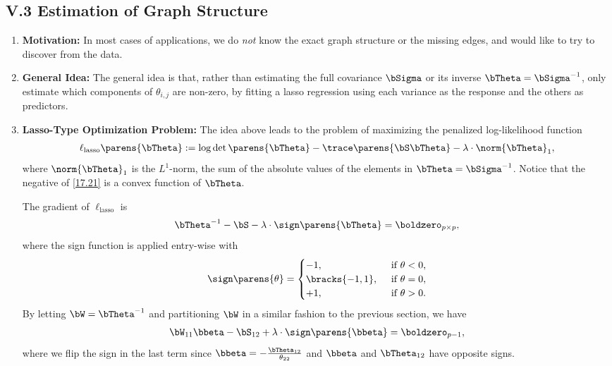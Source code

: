 \documentclass[12pt]{article}
\begin{document}
\subsection*{V.3 Estimation of Graph Structure}

\begin{enumerate}[label=\textbf{\arabic*.}]

	\item \textbf{Motivation:} In most cases of applications, we do \emph{not} know the exact graph structure or the missing edges, and would like to try to discover from the data. 
	
	\item \textbf{General Idea:} The general idea is that, rather than estimating the full covariance $\bSigma$ or its inverse $\bTheta = \bSigma^{-1}$, only estimate which components of $\theta_{i,j}$ are non-zero, by fitting a lasso regression using each variance as the response and the others as predictors. 
	
	\item \textbf{Lasso-Type Optimization Problem:} The idea above leads to the problem of maximizing the penalized log-likelihood function 
	\begin{align}\label{17.21}
		\ell_{\mathrm{lasso}} \parens{\bTheta} := \log \det \parens{\bTheta} - \trace\parens{\bS \bTheta} - \lambda \cdot \norm{\bTheta}_1, 
	\end{align}
	where $\norm{\bTheta}_1$ is the $L^1$-norm, the sum of the absolute values of the elements in $\bTheta = \bSigma^{-1}$. Notice that the negative of \eqref{17.21} is a convex function of $\bTheta$. 
	
	The gradient of $\ell_{\mathrm{lasso}}$ is 
	\begin{align*}
		\bTheta^{-1} - \bS - \lambda \cdot \sign \parens{\bTheta} = \boldzero_{p \times p}, 
	\end{align*}
	where the sign function is applied entry-wise with 
	\begin{align*}
		\sign \parens{\theta} = \begin{cases}
			-1, & \, \text{ if } \theta < 0, \\ 
			\bracks{-1, 1}, & \, \text{ if } \theta = 0, \\ 
			+1, & \, \text{ if } \theta > 0. \\ 
		\end{cases}
	\end{align*}
	By letting $\bW = \bTheta^{-1}$ and partitioning $\bW$ in a similar fashion to the previous section, we have 
	\begin{align}
		\bW_{11} \bbeta - \bS_{12} + \lambda \cdot \sign \parens{\bbeta} = \boldzero_{p-1}, 
	\end{align}
	where we flip the sign in the last term since $\bbeta = - \frac{\bTheta_{12}}{\theta_{22}}$ and $\bbeta$ and $\bTheta_{12}$ have opposite signs. 
	

\end{enumerate}
\end{document}
